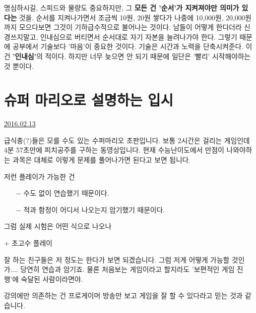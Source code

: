 명심하시길, 스피드와 물량도 중요하지만, 그 \textbf{모든 건 '순서'가 지켜져야만 의미가 있다는} 것을.
순서를 지켜나가면서 조금씩 10원, 20원 쌓다가 나중에 10,000원, 20,000원까지 모으다보면 그것이 기하급수적으로 불어나는 것이다.
남들이 어떻게 한다더라 신경쓰지말고, 인내심으로 버티면서 순서대로 자기 자본을 늘려나가야 한다.
그렇기 때문에 공부에서 기술보다 '마음'이 중요한 것이다. 기술은 시간과 노력을 단축시켜준다. 이건 \textbf{'인내심'}의 적이다.
하지만 너무 늦으면 안 되기 때문에 일단은 '빨리' 시작해야하는 것 뿐이다.
\vspace{5mm}


\section{슈퍼 마리오로 설명하는 입시}
\href{https://www.kockoc.com/Apoc/633676}{2016.02.13}

\vspace{5mm}

급식충(?)들은 모를 수도 있는 수퍼마리오 초판입니다.
보통 2시간은 걸리는 게임인데 4분 57초만에 피치공주를 구하는 동영상입니다.
현재 수능난이도에서 만점이 나와야하는 과목은 대체로 이렇게 문제를 풀어나가면 된다고 보면 됩니다.
\vspace{5mm}

저런 플레이가 가능한 건
\vspace{5mm}

\begin{itemize}
    \item [$-$] 수도 없이 연습했기 때문이다.
    \item [$-$] 적과 함정이 어디서 나오는지 암기했기 때문이다.
\end{itemize}
\vspace{5mm}

그럼 실제 시험은 어떤 식으로 나오나
\vspace{5mm}

+ 초고수 플레이
\vspace{5mm}

잘 하는 친구들은 저 정도는 한다가 보면 되겠습니다.
그럼 저게 어떻게 가능할 것인가.... 당연히 연습과 암기죠.
물론 처음보는 게임이라고 할지라도 '보편적인 게임 진행'에 숙달된 사람이라면야.
\vspace{5mm}

강의에만 의존하는 건 프로게이머 방송만 보고 게임을 잘 할 수 있다라고 믿는 것과 같습니다.
\vspace{5mm}





